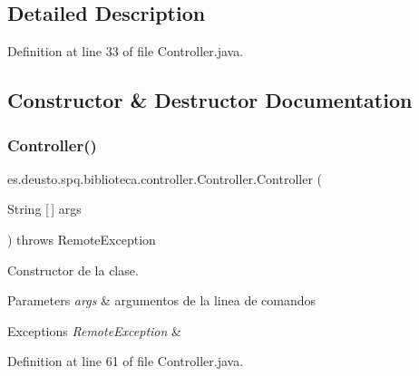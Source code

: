 \subsection{Detailed Description}


Definition at line 33 of file Controller.\+java.



\subsection{Constructor \& Destructor Documentation}
\mbox{\label{classes_1_1deusto_1_1spq_1_1biblioteca_1_1controller_1_1_controller_a130eebcaf76a2f9ed7d3d032ab232746}} 
\subsubsection{\texorpdfstring{Controller()}{Controller()}}
{\footnotesize\ttfamily es.\+deusto.\+spq.\+biblioteca.\+controller.\+Controller.\+Controller (\begin{DoxyParamCaption}\item[{String \mbox{[}$\,$\mbox{]}}]{args }\end{DoxyParamCaption}) throws Remote\+Exception}

Constructor de la clase. 
\begin{DoxyParams}{Parameters}
{\em args} & argumentos de la linea de comandos \\
\hline
\end{DoxyParams}

\begin{DoxyExceptions}{Exceptions}
{\em Remote\+Exception} & \\
\hline
\end{DoxyExceptions}


Definition at line 61 of file Controller.\+java.

